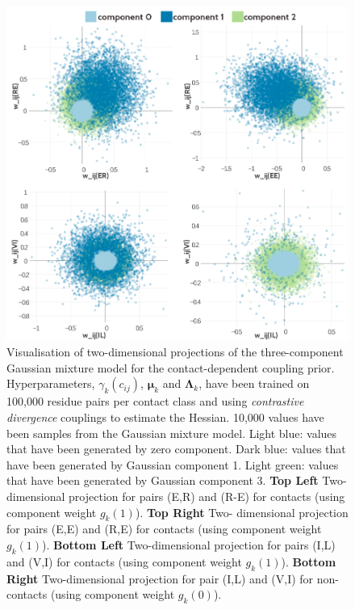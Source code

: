 \documentclass[11pt,a4paper,twoside]{book}
\newcommand{\Lk}{\mathbf{\Lambda}_k}
\newcommand{\muk}{\mathbf{\mu}_k}
\newcommand{\cij}{c_{ij}}
\theoremstyle{definition}
\theoremstyle{definition}
\theoremstyle{remark}
\begin{document}
\begin{figure}
\includegraphics[width=1\linewidth]{img/bayesian_model/cd/3/2dvis_combined_100k} \caption{Visualisation of two-dimensional
projections of the three-component Gaussian mixture model for the
contact-dependent coupling prior. Hyperparameters, \(\gamma_k(\cij)\),
\(\muk\) and \(\Lk\), have been trained on 100,000 residue pairs per
contact class and using \emph{contrastive divergence} couplings to
estimate the Hessian. 10,000 values have been samples from the Gaussian
mixture model. Light blue: values that have been generated by zero
component. Dark blue: values that have been generated by Gaussian
component 1. Light green: values that have been generated by Gaussian
component 3. \textbf{Top Left} Two-dimensional projection for pairs
(E,R) and (R-E) for contacts (using component weight \(g_k(1)\)).
\textbf{Top Right} Two- dimensional projection for pairs (E,E) and (R,E)
for contacts (using component weight \(g_k(1)\)). \textbf{Bottom Left}
Two-dimensional projection for pairs (I,L) and (V,I) for contacts (using
component weight \(g_k(1)\)). \textbf{Bottom Right} Two-dimensional
projection for pair (I,L) and (V,I) for non-contacts (using component
weight \(g_k(0)\)).}\label{fig:vis2d-cd-3comp-100k}
\end{figure}
\end{document}
